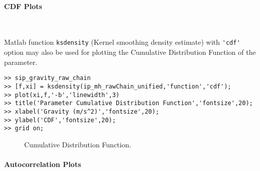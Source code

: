 

\paragraph{CDF Plots} \

Matlab function \verb+ksdensity+ (Kernel smoothing density estimate) with \verb+'cdf'+ option 
may also be used for plotting the Cumulative Distribution Function of the parameter.

\begin{lstlisting}[label=matlab:cdf,caption={Matlab code for the CDF plot.}]
% inside Matlab
>> sip_gravity_raw_chain
>> [f,xi] = ksdensity(ip_mh_rawChain_unified,'function','cdf');
>> plot(xi,f,'-b','linewidth',3)
>> title('Parameter Cumulative Distribution Function','fontsize',20);
>> xlabel('Gravity (m/s^2)','fontsize',20);
>> ylabel('CDF','fontsize',20);
>> grid on;
\end{lstlisting}

\begin{figure}[p]
\centering 
{}
\vspace*{-10pt}
\caption{Cumulative Distribution Function. }
\end{figure}

\paragraph{Autocorrelation Plots}\

